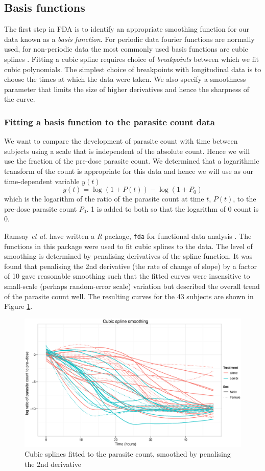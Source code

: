 \subsection{Basis functions}
The first step in FDA is to identify an appropriate smoothing function for our data known as a \emph{basis function}. For periodic data fourier functions are normally used, for non-periodic data the most commonly used basis functions are cubic splines \cite{fdaweb}. Fitting a cubic spline requires choice of \emph{breakpoints} between which we fit cubic polynomials. The simplest choice of breakpoints with longitudinal data is to choose the times at which the data were taken. We also specify a smoothness parameter that limits the size of higher derivatives and hence the sharpness of the curve.

\subsubsection*{Fitting a basis function to the parasite count data}
We want to compare the development of parasite count with time between subjects using a scale that is independent of the absolute count. Hence we will use the fraction of the pre-dose parasite count. We determined that a logarithmic transform of the count is appropriate for this data and hence we will use as our time-dependent variable $y(t)$
$$y(t)=\log (1+P(t))-\log(1+P_{0})$$
which is the logarithm of the ratio of the parasite count at time $t$, $P(t)$, to the pre-dose parasite count $P_{0}$. 1 is added to both so that the logarithm of 0 count is 0.

Ramsay \textit{et al.} have written a \emph{R} package, \texttt{fda} for functional data analysis \cite{fdaR, fdaRbook}. The functions in this package were used to fit cubic splines to the data. The level of smoothing is determined by penalising derivatives of the spline function. It was found that penalising the 2nd derivative (the rate of change of slope) by a factor of 10 gave reasonable smoothing such that the fitted curves were insensitive to small-scale (perhaps random-error scale) variation but described the overall trend of the parasite count well. The resulting curves for the 43 subjects are shown in Figure \ref{cubicspline}.
\begin{figure}[h]
\includegraphics[width=150mm]{cubicspline.eps} 
\caption{Cubic splines fitted to the parasite count, smoothed by penalising the 2nd derivative}
\label{cubicspline}
\end{figure}

